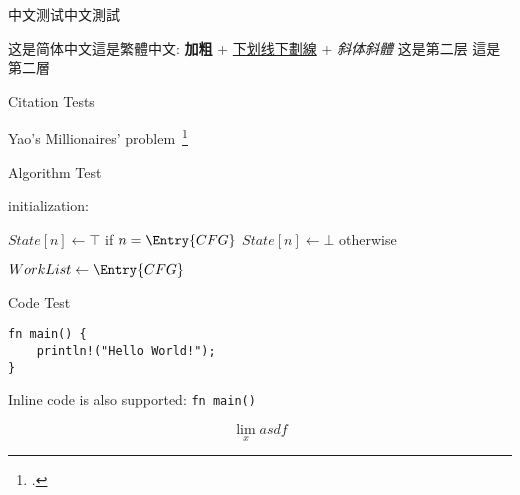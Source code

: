 \begin{frame}{中文测试中文測試}
	\begin{outline}
		\1 这是简体中文這是繁體中文: \textbf{加粗} + \underline{下划线下劃線} + \textit{斜体斜體}
			\2 这是第二层
			\2 這是第二層
	\end{outline}
\end{frame}

\begin{frame}{Citation Tests}
	\begin{outline}
		\1 Yao's Millionaires' problem~\footcite{10.5555/1382436.1382751}
	\end{outline}
\end{frame}

\begin{frame}{Algorithm Test}
    \begin{algorithm}[H]
      \SetAlFnt{\tiny}
      \SetAlCapFnt{\normalsize}
      \SetAlCapNameFnt{\normalsize}
      \scriptsize
      initialization: \parbox[t]{\linewidth}{
        $State[n] \leftarrow \top$ if $n=\Entry{CFG}$\;
        $State[n] \leftarrow \bot$ otherwise\;}
    
      $WorkList \leftarrow \Entry{CFG}$\;
      \caption{Basic algorithm for Abstract Interpretation}
    \end{algorithm}
\end{frame}

\begin{frame}[fragile]{Code Test}
    \begin{verbatim}
fn main() {
    println!("Hello World!");
}
    \end{verbatim}
	\begin{outline}
		\1 Inline code is also supported: \texttt{fn main() { }}
	\end{outline}
    \[
    \lim_x asdf
    \]
\end{frame}

